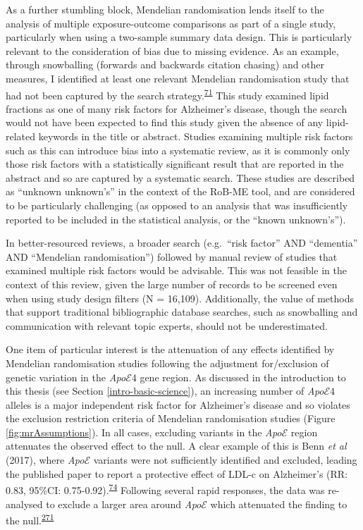 \documentclass[a4paper, twoside]{templates/ociamthesis}
\begin{document}
As a further stumbling block, Mendelian randomisation lends itself to the analysis of multiple exposure-outcome comparisons as part of a single study, particularly when using a two-sample summary data design. This is particularly relevant to the consideration of bias due to missing evidence. As an example, through snowballing (forwards and backwards citation chasing) and other measures, I identified at least one relevant Mendelian randomisation study that had not been captured by the search strategy.\textsuperscript{\protect\hyperlink{ref-larsson2017}{71}} This study examined lipid fractions as one of many risk factors for Alzheimer's disease, though the search would not have been expected to find this study given the absence of any lipid-related keywords in the title or abstract. Studies examining multiple risk factors such as this can introduce bias into a systematic review, as it is commonly only those risk factors with a statistically significant result that are reported in the abstract and so are captured by a systematic search. These studies are described as ``unknown unknown's'' in the context of the RoB-ME tool, and are considered to be particularly challenging (as opposed to an analysis that was insufficiently reported to be included in the statistical analysis, or the ``known unknown's'').

In better-resourced reviews, a broader search (e.g.~``risk factor'' AND ``dementia'' AND ``Mendelian randomisation'') followed by manual review of studies that examined multiple risk factors would be advisable. This was not feasible in the context of this review, given the large number of records to be screened even when using study design filters (N = 16,109). Additionally, the value of methods that support traditional bibliographic database searches, such as snowballing and communication with relevant topic experts, should not be underestimated.

One item of particular interest is the attenuation of any effects identified by Mendelian randomisation studies following the adjustment for/exclusion of genetic variation in the \emph{Apo}\(\mathcal{E}4\) gene region. As discussed in the introduction to this thesis (see Section \ref{intro-basic-science}), an increasing number of \emph{Apo}\(\mathcal{E}4\) alleles is a major independent risk factor for Alzheimer's disease and so violates the exclusion restriction criteria of Mendelian randomisation studies (Figure \ref{fig:mrAssumptions}). In all cases, excluding variants in the \emph{Apo}\(\mathcal{E}\) region attenuates the observed effect to the null. A clear example of this is Benn \emph{et al} (2017), where \emph{Apo}\(\mathcal{E}\) variants were not sufficiently identified and excluded, leading the published paper to report a protective effect of LDL-c on Alzheimer's (RR: 0.83, 95\%CI: 0.75-0.92).\textsuperscript{\protect\hyperlink{ref-benn2017}{74}} Following several rapid responses, the data was re-analysed to exclude a larger area around \emph{Apo}\(\mathcal{E}\) which attenuated the finding to the null.\textsuperscript{\protect\hyperlink{ref-benn2017comment}{271}}
\end{document}
